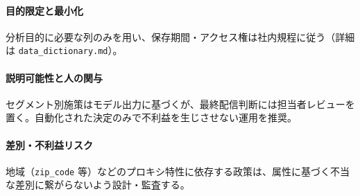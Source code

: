 \paragraph{目的限定と最小化}
分析目的に必要な列のみを用い、保存期間・アクセス権は社内規程に従う（詳細は \texttt{data\_dictionary.md}）。

\paragraph{説明可能性と人の関与}
セグメント別施策はモデル出力に基づくが、最終配信判断には担当者レビューを置く。自動化された決定のみで不利益を生じさせない運用を推奨。

\paragraph{差別・不利益リスク}
地域（\texttt{zip\_code} 等）などのプロキシ特性に依存する政策は、属性に基づく不当な差別に繋がらないよう設計・監査する。
